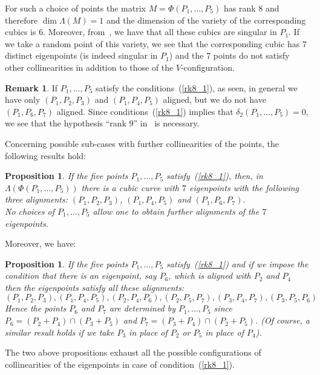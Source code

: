 \documentclass{amsart}
\theoremstyle{plain}
\newtheorem{prop}[lemma]{Proposition}
\theoremstyle{definition}
\newtheorem{rmk}[lemma]{Remark}
\begin{document}
For such a choice
of points the matrix $M = \Phi(P_1, \dots, P_5)$ has rank $8$
and therefore $\dim \Lambda(M) = 1$ and the dimension of the variety
of the corresponding cubics is $6$.
Moreover, from~, we have that all these cubics
are singular in $P_1$.
If we take a random point of this variety, we see that the corresponding
cubic has $7$ distinct eigenpoints (is indeed singular in $P_1$) and the
$7$ points do not satisfy other collinearities in addition to those of the
$V$-configuration.

\begin{rmk}
\label{rmk:particular_cases}
If $P_1, \dots, P_5$ satisfy the conditions~(\ref{rk8_1}), as seen,
in general we have only $(P_1, P_2, P_3)$ and $(P_1, P_4, P_5)$ aligned, but
we do not have $(P_1, P_6, P_7)$ aligned. Since conditions~(\ref{rk8_1})
implies that $\delta_2(P_1, \dots, P_5) = 0$, we see 
that the hypothesis ``rank $9$''
in~ is necessary.
\end{rmk}

Concerning possible sub-cases with further collinearities of the points,
the following results hold:
\begin{prop}
\label{three_d_three_alignments}
If the five points $P_1, \dots, P_5$ satisfy~(\ref{rk8_1}),
then, in $\Lambda(\Phi(P_1, \dotsc, P_5))$ there is
a cubic curve with $7$ eigenpoints with the following three alignments:
$(P_1, P_2, P_3)$, $(P_1, P_4, P_5)$ and $(P_1, P_6, P_7)$. \\
No choices of $P_1, \dots, P_5$ allow one to obtain further alignments of the
$7$ eigenpoints.
\end{prop}
Moreover, we have:
\begin{prop}
\label{prop:d2_6allin}
If the five points $P_1, \dots, P_5$ satisfy~(\ref{rk8_1})
and if we impose the condition that there is an eigenpoint, say $P_6$,
which is aligned with $P_2$ and $P_4$ then the eigenpoints satisfy all these
alignments:
\[
(P_1, P_2, P_3), (P_1, P_4, P_5), (P_2, P_4, P_6), (P_2, P_5, P_7),
(P_3, P_4, P_7), (P_3, P_5, P_6)
\]
Hence the points $P_6$ and $P_7$ are determined by $P_1, \dots, P_5$
since 
$P_6 = (P_2+P_4) \cap (P_3+P_5)$
and $P_7 = (P_3+P_4) \cap (P_2+P_5)$.
(Of course, a similar result holds if we take $P_3$ in place of $P_2$ or $P_5$
in place of $P_4$).
\end{prop}
The two above propositions exhaust all the possible configurations
of collinearities of the eigenpoints in case of condition~(\ref{rk8_1}).
\end{document}
